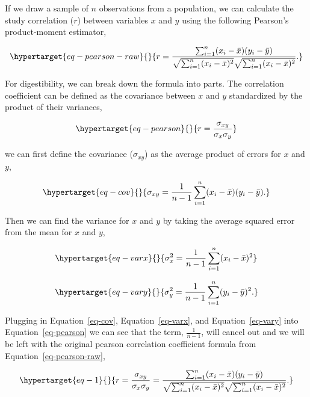 \documentclass[
  letterpaper,
  DIV=11,
  numbers=noendperiod]{scrreprt}
\begin{document}
If we draw a sample of \(n\) observations from a population, we can
calculate the study correlation (\(r\)) between variables \(x\) and
\(y\) using the following Pearson's product-moment estimator,

\begin{equation}\protect\hypertarget{eq-pearson-raw}{}{
r = \frac{
\sum_{i=1}^{n}(x_i - \bar{x})(y_i - \bar{y})
}{
\sqrt{\sum_{i=1}^{n}(x_i - \bar{x})^2}
\sqrt{\sum_{i=1}^{n}(x_i - \bar{x})^2}
}.
}\label{eq-pearson-raw}\end{equation}

For digestibility, we can break down the formula into parts. The
correlation coefficient can be defined as the covariance between \(x\)
and \(y\) standardized by the product of their variances,

\begin{equation}\protect\hypertarget{eq-pearson}{}{
r = \frac{\sigma_{xy}}
{\sigma_x\sigma_y}
}\label{eq-pearson}\end{equation}

we can first define the covariance (\(\sigma_{xy}\)) as the average
product of errors for \(x\) and \(y\),

\begin{equation}\protect\hypertarget{eq-cov}{}{
\sigma_{xy} =\frac{1}{n-1}\sum_{i=1}^{n}(x_i - \bar{x})(y_i - \bar{y}).
}\label{eq-cov}\end{equation}

Then we can find the variance for \(x\) and \(y\) by taking the average
squared error from the mean for \(x\) and \(y\),

\begin{equation}\protect\hypertarget{eq-varx}{}{
\sigma^2_x = \frac{1}{n-1}\sum_{i=1}^n (x_i - \bar{x})^2
}\label{eq-varx}\end{equation}

\begin{equation}\protect\hypertarget{eq-vary}{}{
\sigma^2_y = \frac{1}{n-1}\sum_{i=1}^n (y_i - \bar{y})^2.
}\label{eq-vary}\end{equation}

Plugging in Equation~\ref{eq-cov}, Equation~\ref{eq-varx}, and
Equation~\ref{eq-vary} into Equation~\ref{eq-pearson} we can see that
the term, \(\frac{1}{n-1}\), will cancel out and we will be left with
the original pearson correlation coefficient formula from
Equation~\ref{eq-pearson-raw},

\begin{equation}\protect\hypertarget{eq-1}{}{
r = \frac{\sigma_{xy}}{\sigma_x\sigma_y} = \frac{\sum_{i=1}^{n}(x_i - \bar{x})(y_i - \bar{y})}{\sqrt{\sum_{i=1}^{n}(x_i - \bar{x})^2}\sqrt{\sum_{i=1}^{n}(x_i - \bar{x})^2}}.
}\label{eq-1}\end{equation}
\end{document}
